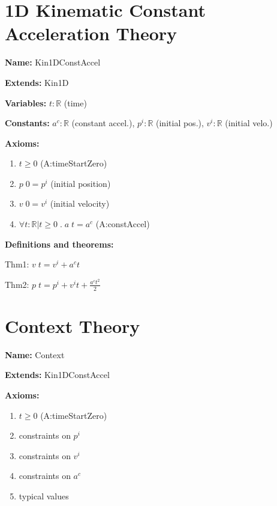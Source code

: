 \documentclass{article}
\begin{document}



\section{1D Kinematic Constant Acceleration Theory}

\noindent \textbf{Name:} Kin1DConstAccel

\noindent \textbf{Extends:} Kin1D

\noindent \textbf{Variables:} $t: {\mathbb{R}}$ (time)

\noindent \textbf{Constants:} ${a^c}: {\mathbb{R}}$ 
(constant accel.), ${p^i}: {\mathbb{R}}$ (initial pos.), ${v^i}: {\mathbb{R}}$ (initial velo.)

\noindent \textbf{Axioms:}

\begin{enumerate}
    \item $t \geq 0$ (A:timeStartZero)
    \item $p \; 0 = p^i$ (initial position)
    \item $v \; 0 = v^i$ (initial velocity)
    \item $\forall t: \mathbb{R} | t \geq 0 \; . \; a \; t = a^c$ (A:constAccel)
\end{enumerate}

\noindent \textbf{Definitions and theorems:}

Thm1: $v \; t = v^i + a^c t$

Thm2: $p \; t = p^i + v^i t + \frac{a^c t^2}{2}$

\section{Context Theory}

\noindent \textbf{Name:} Context

\noindent \textbf{Extends:} Kin1DConstAccel

\noindent \textbf{Axioms:}

\begin{enumerate}
    \item $t \geq 0$ (A:timeStartZero)
    \item constraints on $p^i$
    \item constraints on $v^i$
    \item constraints on $a^c$
    \item typical values
\end{enumerate}
\end{document}
